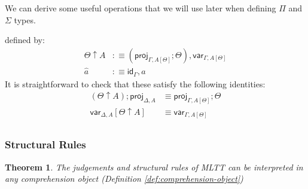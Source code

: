 \documentclass[10pt]{article}
\newtheorem{theorem}{Theorem}
\theoremstyle{definition}
\newcommand{\TYPE}{\,\,\mathsf{Type}}
\newcommand{\id}{\mathsf{id}}
\newcommand{\qyields}{\Vdash}
\newcommand\proj[1]{\ensuremath{\mathsf{proj}_{#1}}}
\newcommand\qvar[1]{\ensuremath{\mathsf{var}_{#1}}}
\begin{document}
We can derive some useful operations that we will use later when defining $\Pi$ and $\Sigma$ types.
defined by:
\begin{align*}
\Theta \uparrow A &:\equiv (\proj{\Gamma, A[\Theta]}; \Theta) , \qvar{\Gamma, A[\Theta]} \\
\hat{a} &:\equiv \id_{\Gamma} , a
\end{align*}
 It is straightforward to check that these satisfy the following identities: 
\begin{align*}
(\Theta \uparrow A) ; \proj{\Delta, A} &\equiv \proj{\Gamma, A[\Theta]} ; \Theta \\
\qvar{\Delta, A}[\Theta \uparrow A] &\equiv \qvar{\Gamma, A[\Theta]} \\
\end{align*}

\subsubsection{Structural Rules}

\begin{theorem}
The judgements and structural rules of MLTT can be interpreted in any comprehension object (Definition \ref{def:comprehension-object})
\end{theorem}
\end{document}
